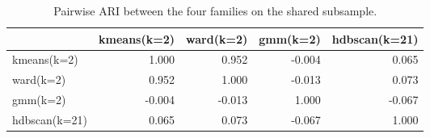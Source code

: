 \begin{table}[htbp]
\centering
\begin{tabular}{lrrrr}
\toprule
 & kmeans(k=2) & ward(k=2) & gmm(k=2) & hdbscan(k=21) \\
\midrule
kmeans(k=2) & 1.000 & 0.952 & -0.004 & 0.065 \\
ward(k=2) & 0.952 & 1.000 & -0.013 & 0.073 \\
gmm(k=2) & -0.004 & -0.013 & 1.000 & -0.067 \\
hdbscan(k=21) & 0.065 & 0.073 & -0.067 & 1.000 \\
\bottomrule
\end{tabular}
\caption{Pairwise ARI between the four families on the shared subsample.}
\label{tab:agreement}
\end{table}
